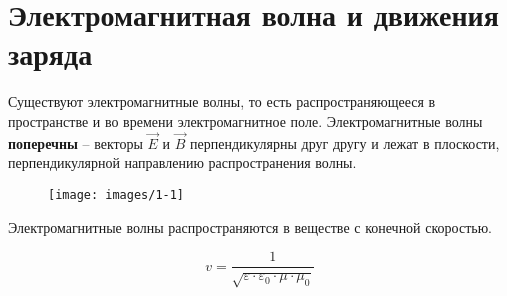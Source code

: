\section{Электромагнитная волна и движения заряда}

Существуют электромагнитные волны, то есть распространяющееся в пространстве и во времени электромагнитное поле. Электромагнитные волны \textbf{поперечны} – векторы $\vec{E}$ и $\vec{B}$ перпендикулярны друг другу и лежат в плоскости, перпендикулярной направлению распространения волны.

\begin{figure}[hb!]
	\centering
	\texttt{[image: images/1-1]}	
\end{figure}

Электромагнитные волны распространяются в веществе с конечной скоростью.

\begin{equation*}
v=\frac{1}{\sqrt{\varepsilon \cdot \varepsilon_0 \cdot \mu \cdot \mu_0}}
\end{equation*}

